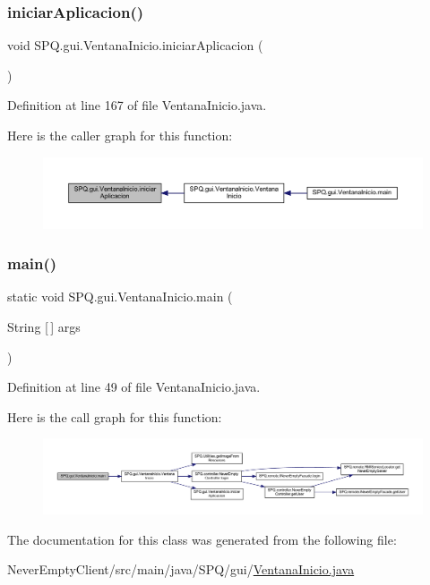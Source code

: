 \subsubsection{\texorpdfstring{iniciar\+Aplicacion()}{iniciarAplicacion()}}
{\footnotesize\ttfamily void S\+P\+Q.\+gui.\+Ventana\+Inicio.\+iniciar\+Aplicacion (\begin{DoxyParamCaption}{ }\end{DoxyParamCaption})}



Definition at line 167 of file Ventana\+Inicio.\+java.

Here is the caller graph for this function\+:
\nopagebreak
\begin{figure}[H]
\begin{center}
\leavevmode
\includegraphics[width=350pt]{class_s_p_q_1_1gui_1_1_ventana_inicio_a0588d157580852e153c5dd2291645173_icgraph}
\end{center}
\end{figure}
\mbox{\label{class_s_p_q_1_1gui_1_1_ventana_inicio_ab33d2c349f8f7475d2d6833e9bf75e76}} 
\subsubsection{\texorpdfstring{main()}{main()}}
{\footnotesize\ttfamily static void S\+P\+Q.\+gui.\+Ventana\+Inicio.\+main (\begin{DoxyParamCaption}\item[{String \mbox{[}$\,$\mbox{]}}]{args }\end{DoxyParamCaption})\hspace{0.3cm}{\ttfamily [static]}}



Definition at line 49 of file Ventana\+Inicio.\+java.

Here is the call graph for this function\+:
\nopagebreak
\begin{figure}[H]
\begin{center}
\leavevmode
\includegraphics[width=350pt]{class_s_p_q_1_1gui_1_1_ventana_inicio_ab33d2c349f8f7475d2d6833e9bf75e76_cgraph}
\end{center}
\end{figure}


The documentation for this class was generated from the following file\+:\begin{DoxyCompactItemize}
\item 
Never\+Empty\+Client/src/main/java/\+S\+P\+Q/gui/\mbox{\hyperlink{_ventana_inicio_8java}{Ventana\+Inicio.\+java}}\end{DoxyCompactItemize}
